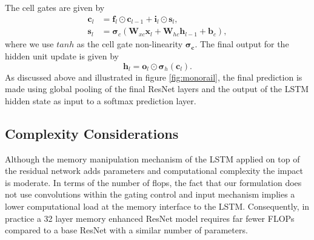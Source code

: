 \documentclass{article}
\begin{document}
The cell gates are given by
\begin{align}
\boldsymbol{c}_l &= \boldsymbol{f}_l  \odot \boldsymbol{c}_{l - 1}
       + \boldsymbol{i}_l \odot
       \boldsymbol{s}_l, \\
\boldsymbol{s}_l &=        \boldsymbol{\sigma}_c(\boldsymbol{W}_{xc} \boldsymbol{x}_l + \boldsymbol{W}_{hc} \boldsymbol{h}_{l-1} + \boldsymbol{b}_c),
\end{align}
where we use \(tanh\) as the cell gate non-linearity \(\boldsymbol{\sigma_{c}}\). The final output for the hidden unit update is given by
\begin{equation}
\boldsymbol{h}_l = \boldsymbol{o}_l \odot \boldsymbol{\sigma}_h(\boldsymbol{c}_l).
\end{equation}
As discussed above and illustrated in figure \ref{fig:monorail}, the final prediction is made using global pooling of the final ResNet layers and the output of the LSTM hidden state as input to a softmax prediction layer.
\subsection{Complexity Considerations}

Although the memory manipulation mechanism of the LSTM applied on top of the residual network adds parameters and computational complexity the impact is moderate.
In terms of the number of flops, the fact that our formulation does not use convolutions within the gating control and input mechanism implies a lower computational load at the memory interface to the LSTM. Consequently, in practice a 32 layer memory enhanced ResNet model requires far fewer FLOPs compared to a base ResNet with a similar number of parameters.
\end{document}
